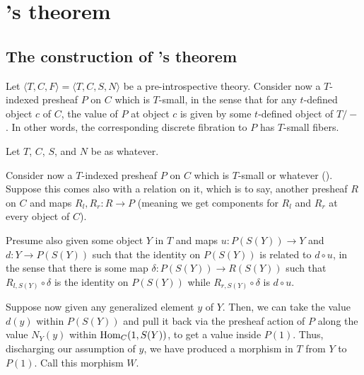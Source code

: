 \section{\Loeb's theorem}


\subsection{The construction of \Loeb's theorem}
\begin{construction}\label{GeneralLoeb}
\end{construction}
Let $\langle T, C, F \rangle = \langle T, C, S, N \rangle$ be a pre-introspective theory. Consider now a $T$-indexed presheaf $P$ on $C$ which is $T$-small, in the sense that for any $t$-defined object $c$ of $C$, the value of $P$ at object $c$ is given by some $t$-defined object of $T/-$. In other words, the corresponding discrete fibration to $P$ has $T$-small fibers.

 Let $T$, $C$, $S$, and $N$ be as whatever.

Consider now a $T$-indexed presheaf $P$ on $C$ which is $T$-small or whatever (\TODO). Suppose this comes also with a relation on it, which is to say, another presheaf $R$ on $C$ and maps $R_l, R_r : R \to P$ (meaning we get components for $R_l$ and $R_r$ at every object of $C$).

Presume also given some object $Y$ in $T$ and maps $u: P(S(Y)) \to Y$ and $d : Y \to P(S(Y))$ such that the identity on $P(S(Y))$ is related to $d \circ u$, in the sense that there is some map $\delta : P(S(Y)) \to R(S(Y))$ such that $R_{l, S(Y)} \circ \delta$ is the identity on $P(S(Y))$ while $R_{r, S(Y)} \circ \delta$ is $d \circ u$.

Suppose now given any generalized element $y$ of $Y$. Then, we can take the value $d(y)$ within $P(S(Y))$ and pull it back via the presheaf action of $P$ along the value $N_Y(y)$ within $\operatorname{Hom}_C(1, S(Y))$, to get a value inside $P(1)$. Thus, discharging our assumption of $y$, we have produced a morphism in $T$ from $Y$ to $P(1)$. Call this morphism $W$.


